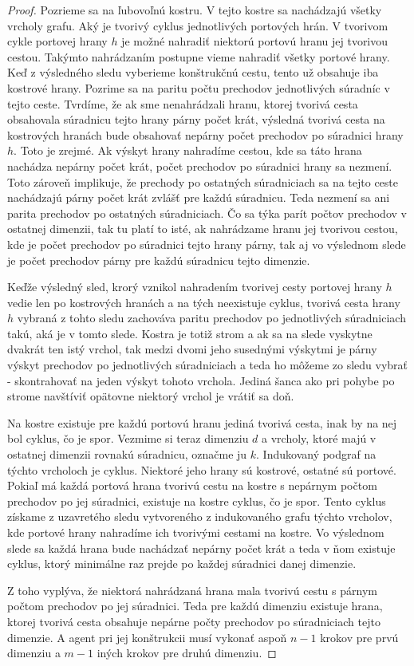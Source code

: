 \begin{proof}
Pozrieme sa na ľubovoľnú kostru. V tejto kostre sa nachádzajú všetky vrcholy
grafu. Aký je tvorivý cyklus jednotlivých portových hrán. V tvorivom cykle
portovej hrany $h$
je možné nahradiť niektorú portovú hranu jej tvorivou cestou. Takýmto
nahrádzaním postupne vieme nahradiť všetky portové hrany. Keď z výsledného
sledu vyberieme konštrukčnú cestu, tento už obsahuje iba kostrové hrany.
Pozrime sa na paritu počtu prechodov jednotlivých súradníc v tejto ceste.
Tvrdíme, že ak sme nenahrádzali hranu, ktorej tvorivá cesta obsahovala
súradnicu tejto hrany párny počet krát, výsledná tvorivá cesta na
kostrových hranách bude obsahovať nepárny počet prechodov po súradnici 
hrany $h$.
Toto je zrejmé. Ak výskyt hrany nahradíme cestou, kde sa táto hrana nachádza
nepárny počet krát, počet prechodov po súradnici hrany sa nezmení. Toto
zároveň implikuje, že prechody po ostatných súradniciach sa na tejto ceste
nachádzajú párny počet krát zvlášť pre každú súradnicu. Teda nezmení sa ani
parita prechodov po ostatných súradniciach.
Čo sa týka parít počtov prechodov v ostatnej dimenzii, tak tu platí to isté,
ak nahrádzame hranu jej tvorivou cestou, kde je počet prechodov po súradnici
tejto hrany párny, tak aj vo výslednom slede je počet prechodov párny pre každú
súradnicu tejto dimenzie.

Keďže výsledný sled, krorý vznikol nahradením tvorivej cesty portovej hrany
$h$ vedie len po kostrových hranách a na tých neexistuje cyklus, tvorivá
cesta hrany $h$ vybraná z tohto sledu zachováva paritu prechodov po
jednotlivých súradniciach takú, aká je v tomto slede.
Kostra je totiž strom a ak sa na slede vyskytne dvakrát ten istý vrchol, tak
medzi dvomi jeho susednými výskytmi je párny výskyt prechodov po
jednotlivých súradniciach a teda ho môžeme zo sledu vybrať - skontrahovať na
jeden výskyt tohoto vrchola. Jediná šanca ako pri pohybe po strome navštíviť
opätovne niektorý vrchol je vrátiť sa doň.

Na kostre existuje pre každú portovú hranu jediná tvorivá cesta, inak by na
nej bol cyklus, čo je spor.
Vezmime si teraz dimenziu $d$ a vrcholy, ktoré majú v ostatnej dimenzii
rovnakú súradnicu, označme ju $k$. Indukovaný podgraf na týchto vrcholoch je
cyklus. Niektoré jeho hrany sú kostrové, ostatné sú portové. Pokiaľ má každá
portová hrana tvorivú cestu na kostre s nepárnym počtom prechodov po jej
súradnici, existuje na kostre cyklus, čo je spor.
Tento cyklus získame z uzavretého sledu vytvoreného z indukovaného grafu
týchto vrcholov, kde portové hrany nahradíme ich tvorivými cestami na
kostre. Vo výslednom slede sa každá hrana bude nachádzať nepárny počet krát
a teda v ňom existuje cyklus, ktorý minimálne raz prejde po každej súradnici
danej dimenzie.

Z toho vyplýva, že niektorá nahrádzaná hrana mala tvorivú cestu s párnym
počtom prechodov po jej súradnici.
Teda pre každú dimenziu existuje hrana, ktorej tvorivá cesta obsahuje
nepárne počty prechodov po súradniciach tejto dimenzie. A agent pri jej
konštrukcii musí vykonať aspoň $n - 1$ krokov pre prvú dimenziu a $m - 1$
iných  krokov pre druhú dimenziu.
\end{proof}


